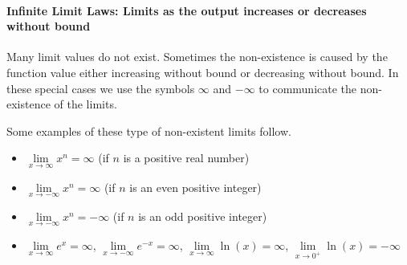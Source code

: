 \documentclass[12pt,]{book}
\theoremstyle{plain}
\theoremstyle{definition}
\numberwithin{equation}{section}
\newcommand{\fe}[2]{#1\mathopen{}\left(#2\right)\mathclose{}}
\begin{document}
\paragraph[Infinite Limit Laws: Limits as the output increases or decreases without bound ]{Infinite Limit Laws: Limits as the output increases or decreases without bound }\label{paragraphs-75}
Many limit values do not exist.  Sometimes the non-existence is caused by the function value either increasing without bound or decreasing without bound.  In these special cases we use the symbols \(\infty\) and \(-\infty\) to communicate the non-existence of the limits.%
\par
Some examples of these type of non-existent limits follow.%
\begin{itemize}[label=\textbullet]
\item{}\(\lim\limits_{x\to\infty}x^n=\infty\) (if \(n\) is a positive real number)\item{}\(\lim\limits_{x\to-\infty}x^n=\infty\) (if \(n\) is an even positive integer)\item{}\(\lim\limits_{x\to-\infty}x^n=-\infty\) (if \(n\) is an odd positive integer)\item{}\(\lim\limits_{x\to\infty}e^x=\infty\), \(\lim\limits_{x\to-\infty}e^{-x}=\infty\), \(\lim\limits_{x\to\infty}\fe{\ln}{x}=\infty\), \(\lim\limits_{x\to0^{+}}\fe{\ln}{x}=-\infty\)\end{itemize}
\typeout{************************************************}
\typeout{************************************************}
\end{document}
